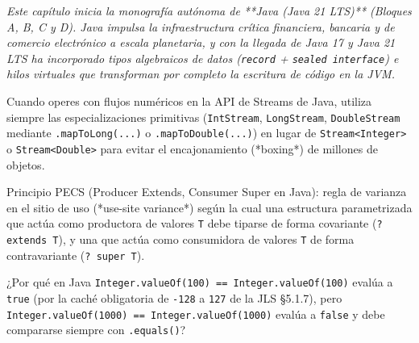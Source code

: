 \documentclass{book}
\begin{document}
\noindent\textit{Este capítulo inicia la monografía autónoma de **Java (Java 21 LTS)** (Bloques A, B, C y D). Java impulsa la infraestructura crítica financiera, bancaria y de comercio electrónico a escala planetaria, y con la llegada de Java 17 y Java 21 LTS ha incorporado tipos algebraicos de datos (\texttt{record} + \texttt{sealed interface}) e hilos virtuales que transforman por completo la escritura de código en la JVM.}

\begin{tcolorbox}[title={Consejo}, studiumtip, breakable]

Cuando operes con flujos numéricos en la API de Streams de Java, utiliza siempre las especializaciones primitivas (\texttt{IntStream}, \texttt{LongStream}, \texttt{DoubleStream} mediante \texttt{.mapToLong(...)} o \texttt{.mapToDouble(...)}) en lugar de \texttt{Stream<Integer>} o \texttt{Stream<Double>} para evitar el encajonamiento (*boxing*) de millones de objetos.
\end{tcolorbox}

\begin{tcolorbox}[title={Definición}, studiumdef, breakable]

Principio PECS (Producer Extends, Consumer Super en Java): regla de varianza en el sitio de uso (*use-site variance*) según la cual una estructura parametrizada que actúa como productora de valores \texttt{T} debe tiparse de forma covariante (\texttt{? extends T}), y una que actúa como consumidora de valores \texttt{T} de forma contravariante (\texttt{? super T}).
\end{tcolorbox}

\begin{tcolorbox}[title={Autoficha}, studiumcheck, breakable]

¿Por qué en Java \texttt{Integer.valueOf(100) == Integer.valueOf(100)} evalúa a \texttt{true} (por la caché obligatoria de \texttt{-128} a \texttt{127} de la JLS §5.1.7), pero \texttt{Integer.valueOf(1000) == Integer.valueOf(1000)} evalúa a \texttt{false} y debe compararse siempre con \texttt{.equals()}?
\end{tcolorbox}
\end{document}
